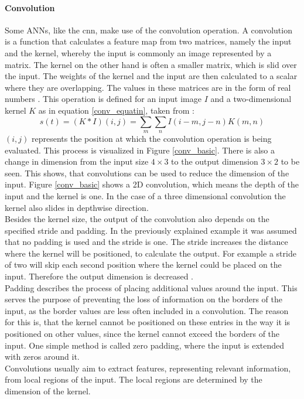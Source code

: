 \paragraph{Convolution}
Some ANNs, like the \acs{cnn}, make use of the convolution operation. 
A convolution is a function that calculates a feature map from two matrices, namely the input and the kernel, whereby the input is commonly an image represented by a matrix. 
The kernel on the other hand is often a smaller matrix, which is slid over the input.
The weights of the kernel and the input are then calculated to a scalar where they are overlapping.
The values in these matrices are in the form of real numbers \cite[327-329]{Goodfellow-et-al-2016}.
This operation is defined for an input image $I$ and a two-dimensional kernel $K$ as in equation \ref{conv_equatin}, taken from \cite[328]{Goodfellow-et-al-2016}:\\
\begin{equation}\label{conv_equatin}
    s(t) = (K \ast I)(i,j) = \sum_{m}\sum_{n}I(i-m,j-n)K(m,n)
\end{equation}
$(i,j)$ represents the position at which the convolution operation is being evaluated. 
This process is visualized in Figure \ref{conv_basic}.
There is also a change in dimension from the input size $4\times3$ to the output dimension $3\times2$ to be seen.
This shows, that convolutions can be used to reduce the dimension of the input.
Figure \ref{conv_basic} shows a 2D convolution, which means the depth of the input and the kernel is one.
In the case of a three dimensional convolution the kernel also slides in depthwise direction.\\
Besides the kernel size, the output of the convolution also depends on the specified stride and padding.
In the previously explained example it was assumed that no padding is used and the stride is one.
The stride increases the distance where the kernel will be positioned, to calculate the output.
For example a stride of two will skip each second position where the kernel could be placed on the input.
Therefore the output dimension is decreased \cite{Albawi2017}.\\
Padding describes the process of placing additional values around the input.
This serves the purpose of preventing the loss of information on the borders of the input, as the border values are less often included in a convolution. 
The reason for this is, that the kernel cannot be positioned on these entries in the way it is positioned on other values, since the kernel cannot exceed the borders of the input.
One simple method is called zero padding, where the input is extended with zeros around it\cite{Albawi2017}.\\
Convolutions usually aim to extract features, representing relevant information, from local regions of the input.
The local regions are determined by the dimension of the kernel. %
